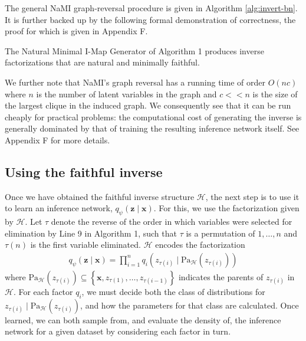  The general NaMI graph-reversal procedure is given in Algorithm \ref{alg:invert-bn}.
It is further backed up by the following formal demonstration of correctness, the proof for which is given in Appendix F.
\vspace{-2pt}\begin{theorem}\label{theorem:correctness}
	The Natural Minimal I-Map Generator of Algorithm 1 produces inverse factorizations that are natural and minimally faithful.
\end{theorem}\vspace{-4pt}

We further note that NaMI's graph reversal has a running time of order $O(nc)$ where $n$ is the number of 
latent variables in the graph and $c<<n$ is the size of the largest clique in the induced graph.  We consequently see that it can be run
cheaply for practical problems: the computational cost of generating the
inverse is generally dominated by that of training the resulting
inference network itself.  See Appendix F for more details.

\subsection{Using the faithful inverse}
Once we have obtained the faithful inverse structure $\mathcal{H}$, the next step is to use it to learn an inference network, $q_\psi(\mathbf{z}\mid\mathbf{x})$. For this, we use the factorization given by $\mathcal{H}$.
Let $\tau$ denote the reverse of the order in which variables were selected for elimination by Line 9 in Algorithm 1, 
such that $\tau$ is a permutation of $1,\dots,n$ and $\tau(n)$ is the first variable eliminated.  
$\mathcal{H}$ encodes the factorization
\begin{align}
q_\psi(\mathbf{z}\mid\mathbf{x})=\prod\nolimits^n_{i=1} q_{i}(z_{\tau(i)}\mid\text{Pa}_\mathcal{H}(z_{\tau(i)}))
\end{align}
where $\text{Pa}_\mathcal{H}(z_{\tau(i)})\subseteq\left\{\mathbf{x},z_{\tau(1)},\dots,z_{\tau(i-1)}\right\}$ indicates the parents of $z_{\tau(i)}$ in $\mathcal{H}$.
For each factor $q_{i}$, we must decide both the class of distributions for $z_{\tau(i)}\mid\text{Pa}_\mathcal{H}(z_{\tau(i)})$, and how the parameters for that class are calculated.
Once learned, we can both sample from, and evaluate the density of, the inference network for a given dataset by considering each factor in turn.

